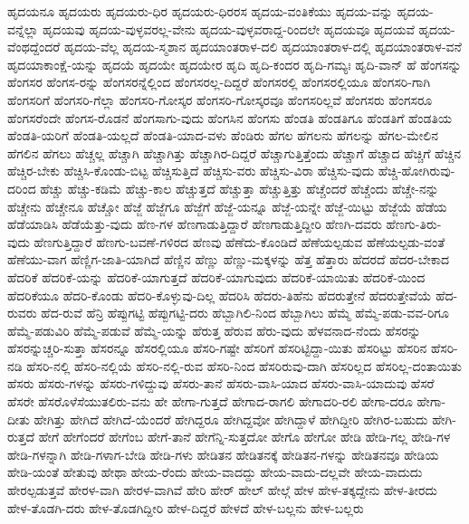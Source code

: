 {ಹೃದಯನೂ
ಹೃದಯರು
ಹೃದಯರು-ಧಿರ
ಹೃದಯರು-ಧಿರರಸ
ಹೃದಯ-ವಂತಿಕೆಯು
ಹೃದಯ-ವನ್ನು
ಹೃದಯ-ವನ್ನೆಲ್ಲಾ
ಹೃದಯವು
ಹೃದಯ-ವುಳ್ಳವರಲ್ಲ-ವೇನು
ಹೃದಯ-ವುಳ್ಳವರಾದ್ದ-ರಿಂದಲೇ
ಹೃದಯವೂ
ಹೃದಯವೆ
ಹೃದಯ-ವೆಂಥದ್ದೆಂದರೆ
ಹೃದಯ-ವೆಲ್ಲ
ಹೃದಯ-ಸ್ಮಶಾನ
ಹೃದಯಾಂತರಾಳ-ದಲಿ
ಹೃದಯಾಂತರಾಳ-ದಲ್ಲಿ
ಹೃದಯಾಂತರಾಳ-ವನೆ
ಹೃದಯಾಕಾಂಕ್ಷೆ-ಯನ್ನು
ಹೃದಯೆ
ಹೃದಯೇ
ಹೃದಯೇರ
ಹೃದಿ
ಹೃದಿ-ಕಂದರ
ಹೃದಿ-ಗಮ್ಯಃ
ಹೃದಿ-ವಾನ್
ಹೆ
ಹೆಂಗಸನ್ನು
ಹೆಂಗಸರ
ಹೆಂಗಸ-ರನ್ನು
ಹೆಂಗಸರನ್ನೆಲ್ಲಿಂದ
ಹೆಂಗಸರಲ್ಲ-ದಿದ್ದರೆ
ಹೆಂಗಸರಲ್ಲಿ
ಹೆಂಗಸರಲ್ಲಿಯೂ
ಹೆಂಗಸರಿ-ಗಾಗಿ
ಹೆಂಗಸರಿಗೆ
ಹೆಂಗಸರಿ-ಗೆಲ್ಲಾ
ಹೆಂಗಸರಿ-ಗೋಸ್ಕರ
ಹೆಂಗಸರಿ-ಗೋಸ್ಕರವೂ
ಹೆಂಗಸರಿಲ್ಲವೆ
ಹೆಂಗಸರು
ಹೆಂಗಸರೂ
ಹೆಂಗಸರೆಂದೇ
ಹೆಂಗಸ-ರೊಡನೆ
ಹೆಂಗಸಾಗು-ವುದು
ಹೆಂಗಸಿನ
ಹೆಂಗಸು
ಹೆಂಡತಿ
ಹೆಂಡತಿಗೂ
ಹೆಂಡತಿಗೆ
ಹೆಂಡತಿಯ
ಹೆಂಡತಿ-ಯರಿಗೆ
ಹೆಂಡತಿ-ಯಲ್ಲದೆ
ಹೆಂಡತಿ-ಯಾದ-ವಳು
ಹೆಂಡಿರು
ಹೆಗಲ
ಹೆಗಲನು
ಹೆಗಲನ್ನು
ಹೆಗಲ-ಮೇಲಿನ
ಹೆಗಲಿನ
ಹೆಗಲು
ಹೆಚ್ಚಲ್ಲ
ಹೆಚ್ಚಾಗಿ
ಹೆಚ್ಚಾಗಿತ್ತು
ಹೆಚ್ಚಾಗಿರ-ದಿದ್ದರೆ
ಹೆಚ್ಚಾಗುತ್ತಿತ್ತೆಂದು
ಹೆಚ್ಚಾಗೆ
ಹೆಚ್ಚಾದ
ಹೆಚ್ಚಿಗೆ
ಹೆಚ್ಚಿನ
ಹೆಚ್ಚಿರ-ಬೇಕು
ಹೆಚ್ಚಿಸಿ-ಕೊಂಡು-ಬಿಟ್ಟ
ಹೆಚ್ಚಿಸುತ್ತಿದೆ
ಹೆಚ್ಚಿಸು-ವರು
ಹೆಚ್ಚಿಸು-ವಿರಾ
ಹೆಚ್ಚಿಸು-ವುದು
ಹೆಚ್ಚಿ-ಹೋಗಿರುವು-ದರಿಂದ
ಹೆಚ್ಚು
ಹೆಚ್ಚು-ಕಡಿಮೆ
ಹೆಚ್ಚು-ಕಾಲ
ಹೆಚ್ಚುತ್ತದೆ
ಹೆಚ್ಚುತ್ತಾ
ಹೆಚ್ಚುತ್ತಿತ್ತು
ಹೆಚ್ಚೆಂದರೆ
ಹೆಚ್ಚೆಂದು
ಹೆಚ್ಚೇ-ನನ್ನು
ಹೆಚ್ಚೇನು
ಹೆಚ್ಚೇನೂ
ಹೆಚ್ಚೋ
ಹೆಜ್ಜೆ
ಹೆಜ್ಜೆಗೂ
ಹೆಜ್ಜೆಗೆ
ಹೆಜ್ಜೆ-ಯನ್ನೂ
ಹೆಜ್ಜೆ-ಯನ್ನೇ
ಹೆಜ್ಜೆ-ಯಿಟ್ಟು
ಹೆಜ್ಜೆಯೆ
ಹೆಡೆಯ
ಹೆಡೆಯಾಡಿಸಿ
ಹೆಡೆಯೆತ್ತು-ವುದು
ಹೆಣ-ಗಳ
ಹೆಣಗಾಡುತ್ತಿದ್ದಾರೆ
ಹೆಣಗಾಡುತ್ತಿದ್ದೀರಿ
ಹೆಣಗಿ-ದವರು
ಹೆಣಗು-ತಿರು-ವುದು
ಹೆಣಗುತ್ತಿದ್ದಾರೆ
ಹೆಣಗು-ಬವಣೆ-ಗಳಿರದ
ಹೆಣವು
ಹೆಣೆದು-ಕೊಂಡಿದೆ
ಹೆಣೆಯಲ್ಪಡುವ
ಹೆಣೆಯಲ್ಪಡು-ವಂತೆ
ಹೆಣೆಯು-ವಾಗ
ಹೆಣ್ಣಿಗ-ಜಾತಿ-ಯಾಗಿದೆ
ಹೆಣ್ಣಿನ
ಹೆಣ್ಣು
ಹೆಣ್ಣು-ಮಕ್ಕಳನ್ನು
ಹೆತ್ತ
ಹೆತ್ತಾರು
ಹೆದರದೆ
ಹೆದರ-ಬೇಕಾದ
ಹೆದರಿಕೆ
ಹೆದರಿಕೆ-ಯನ್ನು
ಹೆದರಿಕೆ-ಯಾಗುತ್ತದೆ
ಹೆದರಿಕೆ-ಯಾಗುವುದು
ಹೆದರಿಕೆ-ಯಾಯಿತು
ಹೆದರಿಕೆ-ಯಿಂದ
ಹೆದರಿಕೆಯೂ
ಹೆದರಿ-ಕೊಂಡು
ಹೆದರಿ-ಕೊಳ್ಳುವು-ದಿಲ್ಲ
ಹೆದರಿಸಿ
ಹೆದರು-ತಿಹೆನು
ಹೆದರುತ್ತೇನೆ
ಹೆದರುತ್ತೇವೆಯೆ
ಹೆದ-ರುವರು
ಹೆದ-ರುವೆ
ಹೆನ್ರಿ
ಹೆಪ್ಪುಗಟ್ಟಿ
ಹೆಪ್ಪುಗಟ್ಟಿ-ದರು
ಹೆಬ್ಬಾಗಿಲಿ-ನಿಂದ
ಹೆಬ್ಬಾಗಿಲು
ಹೆಮ್ಮೆ
ಹೆಮ್ಮೆ-ಪಡು-ವವ-ರಿಗೂ
ಹೆಮ್ಮೆ-ಪಡುವಿರಿ
ಹೆಮ್ಮೆ-ಪಡುವೆ
ಹೆಮ್ಮೆ-ಯನ್ನು
ಹೆರುತ್ತ
ಹೆರುವ
ಹೆರು-ವುದು
ಹೆಳವನಾದ-ನೆಂದು
ಹೆಸರನ್ನು
ಹೆಸರನ್ನುಚ್ಚರಿ-ಸುತ್ತಾ
ಹೆಸರನ್ನೂ
ಹೆಸರಲ್ಲಿಯೂ
ಹೆಸರಿ-ಗಷ್ಟೇ
ಹೆಸರಿಗೆ
ಹೆಸರಿಟ್ಟಿದ್ದಾ-ಯಿತು
ಹೆಸರಿಟ್ಟು
ಹೆಸರಿನ
ಹೆಸರಿ-ನಡಿ
ಹೆಸರಿ-ನಲ್ಲಿ
ಹೆಸರಿ-ನಲ್ಲಿಯೆ
ಹೆಸರಿ-ನಲ್ಲಿ-ರುವ
ಹೆಸರಿ-ನಿಂದ
ಹೆಸರಿರುವು-ದಾಗಿ
ಹೆಸರಿಲ್ಲದ
ಹೆಸರಿಲ್ಲ-ದಂತಾಯಿತು
ಹೆಸರು
ಹೆಸರು-ಗಳನ್ನು
ಹೆಸರು-ಗಳಿದ್ದುವು
ಹೆಸರು-ತಾನೆ
ಹೆಸರು-ವಾಸಿ-ಯಾದ
ಹೆಸರು-ವಾಸಿ-ಯಾದುವು
ಹೆಸರೆ
ಹೆಸರೇ
ಹೆಸರೊಳೆಸೆಯುತಲಿರು-ವನು
ಹೇ
ಹೇಗಾ-ಗುತ್ತದೆ
ಹೇಗಾದ-ರಾಗಲಿ
ಹೇಗಾದರಿ-ರಲಿ
ಹೇಗಾ-ದರೂ
ಹೇಗಾ-ದೀತು
ಹೇಗಿತ್ತು
ಹೇಗಿದೆ
ಹೇಗಿದೆ-ಯೆಂದರೆ
ಹೇಗಿದ್ದರೂ
ಹೇಗಿದ್ದವೋ
ಹೇಗಿದ್ದಾಳೆ
ಹೇಗಿದ್ದೀರಿ
ಹೇಗಿರ-ಬಹುದು
ಹೇಗಿ-ರುತ್ತದೆ
ಹೇಗೆ
ಹೇಗೆಂದರೆ
ಹೇಗೆಂಬ
ಹೇಗೆ-ತಾನೆ
ಹೇಗೆನ್ನಿ-ಸುತ್ತದೋ
ಹೇಗೊ
ಹೇಗೋ
ಹೇಡಿ
ಹೇಡಿ-ಗಲ್ಲ
ಹೇಡಿ-ಗಳ
ಹೇಡಿ-ಗಳನ್ನಾಗಿ
ಹೇಡಿ-ಗಳಾಗ-ಬೇಡಿ
ಹೇಡಿ-ಗಳು
ಹೇಡಿತನ
ಹೇಡಿತನಕ್ಕೆ
ಹೇಡಿತನ-ಗಳನ್ನು
ಹೇಡಿತನವೂ
ಹೇಡಿಯ
ಹೇಡಿ-ಯಂತೆ
ಹೇತುವು
ಹೇಥಾ
ಹೇಯ-ರೆಂದು
ಹೇಯ-ವಾದದ್ದು
ಹೇಯ-ವಾದು-ದಲ್ಲವೇ
ಹೇಯ-ವಾದುದು
ಹೇರಲ್ಪಡುತ್ತವೆ
ಹೇರಳ-ವಾಗಿ
ಹೇರಳ-ವಾಗಿವೆ
ಹೇರಿ
ಹೇರ್
ಹೇಲ್
ಹೇಲ್ಗೆ
ಹೇಳ
ಹೇಳ-ತಕ್ಕದ್ದೇನು
ಹೇಳ-ತೀರದು
ಹೇಳ-ತೊಡಗಿ-ದರು
ಹೇಳ-ತೊಡಗಿದ್ದೀರಿ
ಹೇಳ-ದಿದ್ದರೆ
ಹೇಳದೆ
ಹೇಳ-ಬಲ್ಲನು
ಹೇಳ-ಬಲ್ಲರು
}
